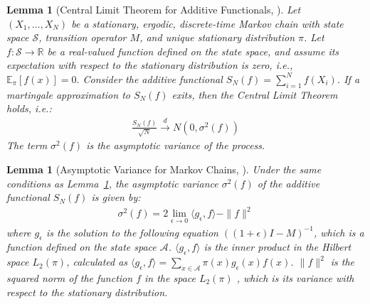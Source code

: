 \documentclass{article}
\theoremstyle{plain}
\newtheorem{lemma}[theorem]{Lemma}
\theoremstyle{definition}
\theoremstyle{remark}
\begin{document}
\begin{lemma}[Central Limit Theorem for Additive Functionals, \cite{HOLZMANN20051518}] \label{lemma:clt-AF}
    Let $(X_1, \dots, X_N)$ be a stationary, ergodic, discrete-time Markov chain with state space $\mathcal{S}$, transition operator $M$, and unique stationary distribution $\pi$. Let $f: \mathcal{S} \rightarrow \mathbb{R}$ be a real-valued function defined on the state space, and assume its expectation with respect to the stationary distribution is zero, i.e., $\mathbb{E}_{\pi} [f(x)]=0.$ Consider the additive functional $S_N(f)=\sum_{i=1}^Nf(X_i)$. If a martingale approximation to $S_N(f)$ exits, then the Central Limit Theorem holds, i.e.:
    \begin{align}
        \frac{S_N(f)}{\sqrt{N}} \xrightarrow{d} N(0,\sigma^2(f)) 
    \end{align}
    The term $\sigma^2(f)$ is the asymptotic variance of the process.
\end{lemma}


\begin{lemma}[Asymptotic Variance for Markov Chains, \cite{HOLZMANN20051518}] \label{lemma:var-markov-chain}
    Under the same conditions as Lemma~\ref{lemma:clt-AF}, the asymptotic variance $\sigma^2(f)$ of the additive functional $S_N(f)$ is given by:
\begin{align}
    \sigma^2(f) = 2\lim_{\epsilon\rightarrow 0} \langle g_{\epsilon},f \rangle - \|f\|^2
\end{align}
where $g_{\epsilon}$ is the solution to the following equation $((1+\epsilon)I-M)^{-1}$, which is a function defined on the state space $\mathcal{A}$. $\langle g_{\epsilon},f \rangle$ is the inner product in the Hilbert space $L_2(\pi)$, calculated as $\langle g_{\epsilon},f \rangle =\sum_{x\in \mathcal{A}}\pi(x)g_{\epsilon}(x)f(x)$. $\|f\|^2$ is the squared norm of the function $f$ in the space $L_2(\pi)$ , which is its variance with respect to the stationary distribution.

\end{lemma}
\end{document}
